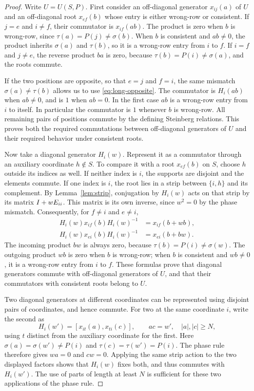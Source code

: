 \begin{proof}
Write $U=U(S,P)$. First consider an off-diagonal generator
$x_{ij}(a)$ of $U$ and an off-diagonal root $x_{ef}(b)$ whose entry
is either wrong-row or consistent. If $j=e$ and $i\ne f$, their
commutator is $x_{if}(ab)$. The product is zero when $b$ is
wrong-row, since $\tau(a)=P(j)\ne\sigma(b)$. When $b$ is
consistent and $ab\ne0$, the product inherits $\sigma(a)$ and
$\tau(b)$, so it is a wrong-row entry from $i$ to $f$.
If $i=f$ and $j\ne e$, the reverse product $ba$ is zero, because
$\tau(b)=P(i)\ne\sigma(a)$, and the roots commute.

If the two positions are opposite, so that $e=j$ and $f=i$, the
same mismatch $\sigma(a)\ne\tau(b)$ allows us to use
\eqref{eq:long-opposite}. The commutator is $H_i(ab)$ when
$ab\ne0$, and is $1$ when $ab=0$. In the first case $ab$ is a
wrong-row entry from $i$ to itself. In particular the commutator is
$1$ whenever $b$ is wrong-row. All remaining pairs of positions
commute by the defining Steinberg relations. This proves both the
required commutations between off-diagonal generators of $U$ and
their required behavior under consistent roots.

Now take a diagonal generator $H_i(w)$. Represent it as a
commutator through an auxiliary coordinate $h\notin S$. To compare
it with a root $x_{ef}(b)$ on $S$, choose $h$ outside its indices
as well. If neither index is $i$, the supports are disjoint and the
elements commute. If one index is $i$, the root lies in a strip
between $\{i,h\}$ and its complement. By
Lemma~\ref{lem:strip}, conjugation by $H_i(w)$ acts on that strip
by its matrix $I+wE_{ii}$. This matrix is its own inverse,
since $w^2=0$ by the phase mismatch. Consequently, for $f\ne i$
and $e\ne i$,
\begin{align*}
 H_i(w)x_{if}(b)H_i(w)^{-1}&=x_{if}(b+wb),\\
 H_i(w)x_{ei}(b)H_i(w)^{-1}&=x_{ei}(b+bw).
\end{align*}
The incoming product $bw$ is always zero, because
$\tau(b)=P(i)\ne\sigma(w)$. The outgoing product $wb$ is zero
when $b$ is wrong-row; when $b$ is consistent and $wb\ne0$, it is
a wrong-row entry from $i$ to $f$. These formulas prove that
diagonal generators commute with off-diagonal generators of $U$,
and that their commutators with consistent roots belong to $U$.

Two diagonal generators at different coordinates can be represented
using disjoint pairs of coordinates, and hence commute. For two at
the same coordinate $i$, write the second as
\[
 H_i(w')=[x_{it}(a),x_{ti}(c)],\qquad ac=w',\quad |a|,|c|\ge N,
\]
using $t$ distinct from the auxiliary coordinate for the first.
Here $\sigma(a)=\sigma(w')\ne P(i)$ and
$\tau(c)=\tau(w')=P(i)$. The phase rule therefore gives
$wa=0$ and $cw=0$. Applying the same strip action to the two
displayed factors shows that $H_i(w)$ fixes both, and thus commutes
with $H_i(w')$. The use of parts of length at least $N$ is sufficient
for these two applications of the phase rule.


\end{proof}
